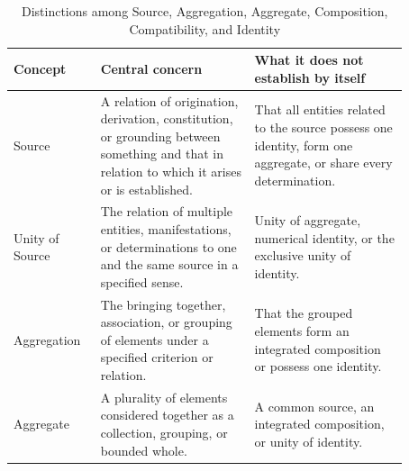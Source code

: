 %
%
%
%

\begin{table}[htbp]
\centering
\small
\renewcommand{\arraystretch}{1.35}
\setlength{\tabcolsep}{4pt}

\caption{Distinctions among Source, Aggregation, Aggregate,
Composition, Compatibility, and Identity}
\label{tab:source-aggregate-compatibility-and-identity}

\begin{tabular}{
    |p{0.17\linewidth}
    |p{0.35\linewidth}
    |p{0.35\linewidth}|
}
\hline
\textbf{Concept}
&
\textbf{Central concern}
&
\textbf{What it does not establish by itself}
\\
\hline

Source
&
A relation of origination, derivation, constitution,
or grounding between something and that in relation
to which it arises or is established.
&
That all entities related to the source possess
one identity, form one aggregate, or share every
determination.
\\
\hline

Unity of Source
&
The relation of multiple entities, manifestations,
or determinations to one and the same source
in a specified sense.
&
Unity of aggregate, numerical identity, or
the exclusive unity of identity.
\\
\hline

Aggregation
&
The bringing together, association, or grouping
of elements under a specified criterion or relation.
&
That the grouped elements form an integrated
composition or possess one identity.
\\
\hline

Aggregate
&
A plurality of elements considered together
as a collection, grouping, or bounded whole.
&
A common source, an integrated composition,
or unity of identity.
\\
\hline


\end{tabular}
\end{table}
